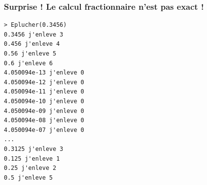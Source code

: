 \documentclass[10pt]{beamer}
\begin{document}
\begin{frame}[fragile]
  \frametitle{Surprise ! Le calcul fractionnaire n'est pas exact !}
\begin{lstlisting}
> Eplucher(0.3456)
0.3456 j'enleve 3
0.456 j'enleve 4
0.56 j'enleve 5
0.6 j'enleve 6
4.050094e-13 j'enleve 0
4.050094e-12 j'enleve 0
4.050094e-11 j'enleve 0
4.050094e-10 j'enleve 0
4.050094e-09 j'enleve 0
4.050094e-08 j'enleve 0
4.050094e-07 j'enleve 0
...
0.3125 j'enleve 3
0.125 j'enleve 1
0.25 j'enleve 2
0.5 j'enleve 5
\end{lstlisting}
\end{frame}

 \questionSlide

 \appendix
 \backupSlides





\end{document}
